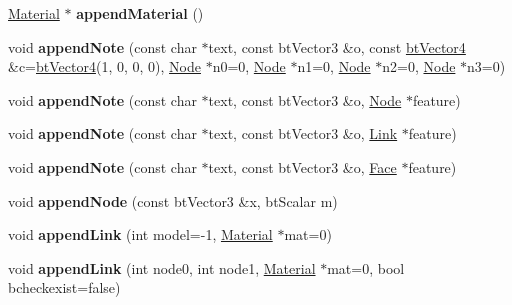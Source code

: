 \begin{DoxyCompactItemize}
\item 
\mbox{\label{classbtSoftBody_a9f982578b7de055039a75e5904152b6d}} 
\hyperlink{structbtSoftBody_1_1Material}{Material} $\ast$ {\bfseries append\+Material} ()
\item 
\mbox{\label{classbtSoftBody_aa672f32eb59763f5175c7f823615db98}} 
void {\bfseries append\+Note} (const char $\ast$text, const bt\+Vector3 \&o, const \hyperlink{classbtVector4}{bt\+Vector4} \&c=\hyperlink{classbtVector4}{bt\+Vector4}(1, 0, 0, 0), \hyperlink{structbtSoftBody_1_1Node}{Node} $\ast$n0=0, \hyperlink{structbtSoftBody_1_1Node}{Node} $\ast$n1=0, \hyperlink{structbtSoftBody_1_1Node}{Node} $\ast$n2=0, \hyperlink{structbtSoftBody_1_1Node}{Node} $\ast$n3=0)
\item 
\mbox{\label{classbtSoftBody_a5c4f5428c421191e55babc34b4672924}} 
void {\bfseries append\+Note} (const char $\ast$text, const bt\+Vector3 \&o, \hyperlink{structbtSoftBody_1_1Node}{Node} $\ast$feature)
\item 
\mbox{\label{classbtSoftBody_aa71ccf539cb5b4e79d6b07a6f503af65}} 
void {\bfseries append\+Note} (const char $\ast$text, const bt\+Vector3 \&o, \hyperlink{structbtSoftBody_1_1Link}{Link} $\ast$feature)
\item 
\mbox{\label{classbtSoftBody_a15285f0ac6eb1d24a25b58cd05eefb39}} 
void {\bfseries append\+Note} (const char $\ast$text, const bt\+Vector3 \&o, \hyperlink{structbtSoftBody_1_1Face}{Face} $\ast$feature)
\item 
\mbox{\label{classbtSoftBody_a6259e16009323fc8e936966b1fba1324}} 
void {\bfseries append\+Node} (const bt\+Vector3 \&x, bt\+Scalar m)
\item 
\mbox{\label{classbtSoftBody_ad632d23c33118bc061ac171a0a99ad20}} 
void {\bfseries append\+Link} (int model=-\/1, \hyperlink{structbtSoftBody_1_1Material}{Material} $\ast$mat=0)
\item 
\mbox{\label{classbtSoftBody_a9af70d96f1962fe82baec96ef236010d}} 
void {\bfseries append\+Link} (int node0, int node1, \hyperlink{structbtSoftBody_1_1Material}{Material} $\ast$mat=0, bool bcheckexist=false)

\end{DoxyCompactItemize}

